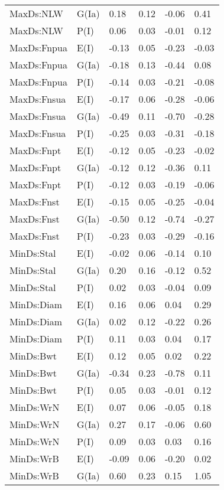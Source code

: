 \begin{center}
\begin{longtable}{|p{1.1in}|p{0.7in}|p{0.7in}|p{0.6in}|p{0.6in}|p{0.6in}|}
  MaxDs:NLW & G(Ia) & 0.18 & 0.12 & -0.06 & 0.41 \\ 
  MaxDs:NLW & P(I) & 0.06 & 0.03 & -0.01 & 0.12 \\ 
  MaxDs:Fnpua & E(I) & -0.13 & 0.05 & -0.23 & -0.03 \\ 
  MaxDs:Fnpua & G(Ia) & -0.18 & 0.13 & -0.44 & 0.08 \\ 
  MaxDs:Fnpua & P(I) & -0.14 & 0.03 & -0.21 & -0.08 \\ 
  MaxDs:Fnsua & E(I) & -0.17 & 0.06 & -0.28 & -0.06 \\ 
  MaxDs:Fnsua & G(Ia) & -0.49 & 0.11 & -0.70 & -0.28 \\ 
  MaxDs:Fnsua & P(I) & -0.25 & 0.03 & -0.31 & -0.18 \\ 
  MaxDs:Fnpt & E(I) & -0.12 & 0.05 & -0.23 & -0.02 \\ 
  MaxDs:Fnpt & G(Ia) & -0.12 & 0.12 & -0.36 & 0.11 \\ 
  MaxDs:Fnpt & P(I) & -0.12 & 0.03 & -0.19 & -0.06 \\ 
  MaxDs:Fnst & E(I) & -0.15 & 0.05 & -0.25 & -0.04 \\ 
  MaxDs:Fnst & G(Ia) & -0.50 & 0.12 & -0.74 & -0.27 \\ 
  MaxDs:Fnst & P(I) & -0.23 & 0.03 & -0.29 & -0.16 \\ 
  MinDs:Stal & E(I) & -0.02 & 0.06 & -0.14 & 0.10 \\ 
  MinDs:Stal & G(Ia) & 0.20 & 0.16 & -0.12 & 0.52 \\ 
  MinDs:Stal & P(I) & 0.02 & 0.03 & -0.04 & 0.09 \\ 
  MinDs:Diam & E(I) & 0.16 & 0.06 & 0.04 & 0.29 \\ 
  MinDs:Diam & G(Ia) & 0.02 & 0.12 & -0.22 & 0.26 \\ 
  MinDs:Diam & P(I) & 0.11 & 0.03 & 0.04 & 0.17 \\ 
  MinDs:Bwt & E(I) & 0.12 & 0.05 & 0.02 & 0.22 \\ 
  MinDs:Bwt & G(Ia) & -0.34 & 0.23 & -0.78 & 0.11 \\ 
  MinDs:Bwt & P(I) & 0.05 & 0.03 & -0.01 & 0.12 \\ 
  MinDs:WrN & E(I) & 0.07 & 0.06 & -0.05 & 0.18 \\ 
  MinDs:WrN & G(Ia) & 0.27 & 0.17 & -0.06 & 0.60 \\ 
  MinDs:WrN & P(I) & 0.09 & 0.03 & 0.03 & 0.16 \\ 
  MinDs:WrB & E(I) & -0.09 & 0.06 & -0.20 & 0.02 \\ 
  MinDs:WrB & G(Ia) & 0.60 & 0.23 & 0.15 & 1.05 \\ 

\end{longtable}
\end{center}
